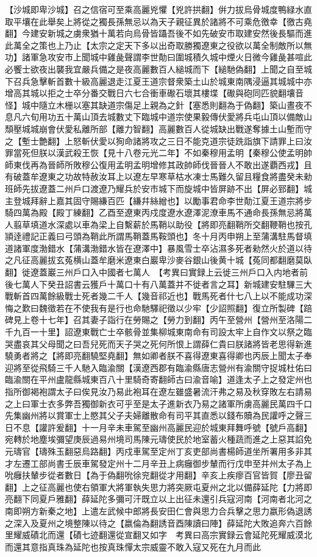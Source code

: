【沙城即卑沙城】召之信宿可至乘高麗兇懼【兇許拱翻】倂力拔烏骨城度鴨緑水直取平壤在此舉矣上將從之獨長孫無忌以為天子親征異於諸將不可乘危徼幸【徼古堯翻】今建安新城之虜衆猶十萬若向烏骨皆躡吾後不如先破安市取建安然後長驅而進此萬全之策也上乃止【太宗之定天下多以出奇取勝獨遼東之役欲以萬全制敵所以無功】諸軍急攻安市上聞城中雞彘聲謂李世勣曰圍城積久城中煙火日微今雞彘甚喧此必饗士欲夜出襲我宜嚴兵備之是夜高麗數百人縋城而下【縋馳偽翻】上聞之自至城下召兵急擊斬首數十級高麗退走江夏王道宗督衆築土山於城東南隅浸逼其城城中亦增高其城以拒之士卒分番交戰日六七合衝車礮石壞其樓堞【礮與砲同匹貌翻壤音怪】城中隨立木栅以塞其缺道宗傷足上親為之針【塞悉則翻為于偽翻】築山晝夜不息凡六旬用功五十萬山頂去城數丈下臨城中道宗使果毅傳伏愛將兵屯山頂以備敵山頹壓城城崩會伏愛私離所部【離力智翻】高麗數百人從城缺出戰遂奪據土山塹而守之【塹士艶翻】上怒斬伏愛以狥命諸將攻之三日不能克道宗徒跣詣旗下請罪上曰汝罪當死但朕以漢武殺王恢【見十八卷元光二年】不如秦穆用孟明【秦穆公使孟明帥師東伐再為晉師所敗穆公復用孟明孟明增修其政帥師伐晉晉人不敢出遂覇西戎】且有破蓋牟遼東之功故特赦汝耳上以遼左早寒草枯水凍士馬難久留且糧食將盡癸未勑班師先拔遼蓋二州戶口渡遼乃耀兵於安市城下而旋城中皆屏跡不出【屏必郅翻】城主登城拜辭上嘉其固守賜縑百匹【縑幷絲繒也】以勵事君命李世勣江夏王道宗將步騎四萬為殿【殿丁練翻】乙酉至遼東丙戍度遼水遼澤泥潦車馬不通命長孫無忌將萬人翦草填道水深處以車為梁上自繫薪於馬鞘以助役【將即亮翻鞘所交翻鞭鞘也按孔頴逹禮記正義曰弓頭為鞘此所謂馬鞘蓋馬鞍頭也】冬十月丙申朔上至蒲溝駐馬督填道諸軍度渤錯水【蒲溝渤錯水皆在遼澤中】暴風雪士卒沾濕多死者勑然火於道以待之凡征高麗拔玄菟横山蓋牟磨米遼東白巖卑沙麥谷銀山後黄十城【菟同都翻磨莫臥翻】徙遼蓋巖三州戶口入中國者七萬人　【考異曰實録上云徙三州戶口入内地者前後七萬人下癸丑詔書云獲戶十萬口十有八萬蓋并不徙者言之耳】新城建安駐驆三大戰斬首四萬餘級戰士死者幾二千人【幾音祁近也】戰馬死者什七八上以不能成功深悔之歎曰魏徵若在不使我有是行也命馳驛祀徵以少牢【少詔照翻】復立所製碑【踣碑見上卷十七年】召其妻子詣行在勞賜之【勞力到翻】丙午至營州【營州至洛陽二千九百一十里】詔遼東戰亡士卒骸骨並集柳城東南命有司設太牢上自作文以祭之臨哭盡哀其父母聞之曰吾兒死而天子哭之死何所恨上謂薛仁貴曰朕諸將皆老思得新進驍勇者將之【將即亮翻驍堅堯翻】無如卿者朕不喜得遼東喜得卿也丙辰上聞太子奉迎將至從飛騎三千人馳入臨渝關【漢遼西郡有臨渝縣唐志營州有渝關守捉城杜佑曰臨渝關在平州盧龍縣城東百八十里騎奇寄翻師古曰渝音喻】道逢太子上之發定州也指所御褐袍謂太子曰俟見汝乃易此袍耳在遼左雖盛暑流汗弗之易及秋穿敗左右請易之上曰軍士衣多弊吾獨御新衣可乎至是太子進新衣乃易之諸軍所虜高麗民萬四千口先集幽州將以賞軍士上愍其父子夫婦離散命有司平其直悉以錢布贖為民讙呼之聲三日不息【讙許爰翻】十一月辛未車駕至幽州高麗民迎於城東拜舞呼號【號戶高翻】宛轉於地塵埃彌望庚辰過易州境司馬陳元璹使民於地室蓄火種蔬而進之上惡其諂免元璹官【璹殊玉翻惡烏路翻】丙戍車駕至定州丁亥吏部尚書楊師道坐所署用多非其才左遷工部尚書壬辰車駕發定州十二月辛丑上病癰御步輦而行戊申至并州太子為上吮癰扶輦步從者數日【為于偽翻吮徐兖翻從才用翻】辛亥上疾瘳百官皆賀【廖丑留翻】上之征高麗也使右領軍大將軍執失思力將突厥屯夏州之北以備薛延陀【力將即亮翻下同夏戶雅翻】薛延陀多彌可汗既立以上出征未還引兵寇河南【河南者北河之南即朔方新秦之地】上遣左武候中郎將長安田仁會與思力合兵擊之思力嬴形偽退誘之深入及夏州之境整陳以待之【嬴倫為翻誘音酉陳讀曰陣】薛延陀大敗追奔六百餘里耀威磧北而還【磧七迹翻還從宣翻又如字　考異曰高宗實録云會延陀死耀威漠北而還其意指真珠為延陀也按真珠憚太宗威靈不敢入寇又死在九月而此